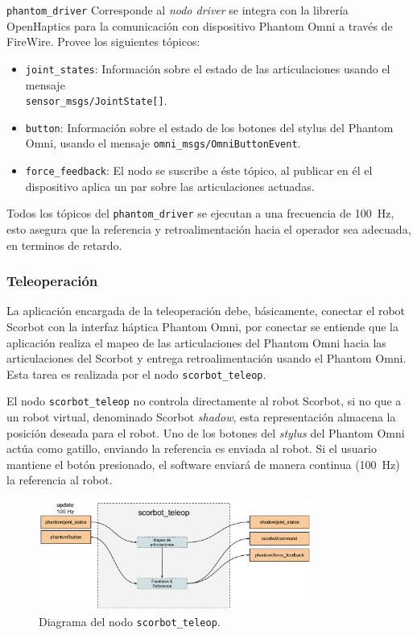\texttt{phantom\_driver} Corresponde al \textit{nodo driver} se integra con la librería OpenHaptics para la comunicación con dispositivo Phantom Omni a través de FireWire. Provee los siguientes tópicos:

\begin{itemize}
\item \texttt{joint\_states}: Información sobre el estado de las articulaciones usando el mensaje \\ \texttt{sensor\_msgs/JointState[]}.

\item \texttt{button}: Información sobre el estado de los botones del stylus del Phantom Omni, usando el mensaje \texttt{omni\_msgs/OmniButtonEvent}.

\item \texttt{force\_feedback}: El nodo se suscribe a éste tópico, al publicar en él el dispositivo aplica un par sobre las articulaciones actuadas.
\end{itemize}

Todos los tópicos del \texttt{phantom\_driver} se ejecutan a una frecuencia de \SI{100}{\hertz}, esto asegura que la referencia y retroalimentación hacia el operador sea adecuada, en terminos de retardo.


\subsubsection{Teleoperación}\label{cap4_teleoperacion}

La aplicación encargada de la teleoperación debe, básicamente, conectar el robot Scorbot con la interfaz háptica Phantom Omni, por conectar se entiende que la aplicación realiza el mapeo de las articulaciones del Phantom Omni hacia las articulaciones del Scorbot y entrega retroalimentación usando el Phantom Omni. Esta tarea es realizada por el nodo \texttt{scorbot\_teleop}.

El nodo \texttt{scorbot\_teleop} no controla directamente al robot Scorbot, si no que a un robot virtual, denominado Scorbot \textit{shadow}, esta representación almacena la posición deseada para el robot. Uno de los botones del \textit{stylus} del Phantom Omni actúa como gatillo, enviando la referencia es enviada al robot. Si el usuario mantiene el botón presionado, el software enviará de manera continua (\SI{100}{\hertz}) la referencia al robot.

\begin{figure}[H]
  \centering
  \includegraphics[width=0.8\textwidth]{img/cap4/scorbot_teleop.pdf}
  \caption{Diagrama del nodo \texttt{scorbot\_teleop}.}
  \label{cap4_scorbot_teleop}
\end{figure}

